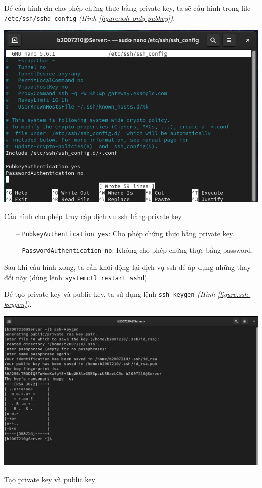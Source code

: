 \documentclass[a4paper, 11pt]{article}
\begin{document}
Để cấu hình chỉ cho phép chứng thực bằng private key, ta sẽ cấu hình trong file \texttt{/etc/ssh/sshd\_config} \textit{(Hình \ref{figure:ssh-only-pubkey})}. \\
\begin{minipage}
    {\linewidth}
    \captionsetup{type=figure}
    \centering
    \includegraphics[width=\linewidth]{images/ssh-only-pubkey.png}
    \caption{Cấu hình cho phép truy cập dịch vụ ssh bằng private key}
    \label{figure:ssh-only-pubkey}
\end{minipage}
\begin{itemize}
    \item[--] \texttt{PubkeyAuthentication yes}: Cho phép chứng thực bằng private key.
    \item[--] \texttt{PasswordAuthentication no}: Không cho phép chứng thực bằng password.
\end{itemize}
Sau khi cấu hình xong, ta cần khởi động lại dịch vụ ssh để áp dụng những thay đổi này (dùng lệnh \texttt{systemctl restart sshd}).

Để tạo private key và public key, ta sử dụng lệnh \texttt{ssh-keygen} \textit{(Hình \ref{figure:ssh-keygen})}. \\
\begin{minipage}
    {\linewidth}
    \captionsetup{type=figure}
    \centering
    \includegraphics[width=\linewidth]{images/ssh-keygen.png}
    \caption{Tạo private key và public key}
    \label{figure:ssh-keygen}
\end{minipage}
\end{document}
